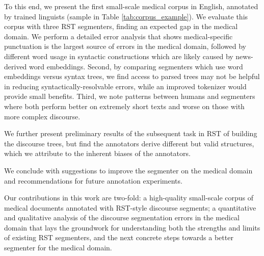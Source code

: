 To this end, we present the first small-scale medical corpus in English, annotated by trained linguists (sample in Table \ref{tab:corpus_example}). We evaluate this corpus with three RST segmenters, finding an expected gap in the medical domain. We perform a detailed error analysis that shows medical-specific punctuation is the largest source of errors in the medical domain, followed by different word usage in syntactic constructions which are likely caused by news-derived word embeddings. Second, by comparing segmenters which use word embeddings versus syntax trees, we find access to parsed trees may not be helpful in reducing syntactically-resolvable errors, while an improved tokenizer would provide small benefits. Third, we note patterns between humans and segmenters where both perform better on extremely short texts and worse on those with more complex discourse. 

We further present preliminary results of the subsequent task in RST of building the discourse trees, but find the annotators derive different but valid structures, which we attribute to the inherent biases of the annotators. 

We conclude with suggestions to improve the segmenter on the medical domain and recommendations for future annotation experiments.

Our contributions in this work are two-fold: a high-quality small-scale corpus of medical documents annotated with RST-style discourse segments; a quantitative and qualitative analysis of the discourse segmentation errors in the medical domain that lays the groundwork for understanding both the strengths and limits of existing RST segmenters, and the next concrete steps towards a better segmenter for the medical domain.

